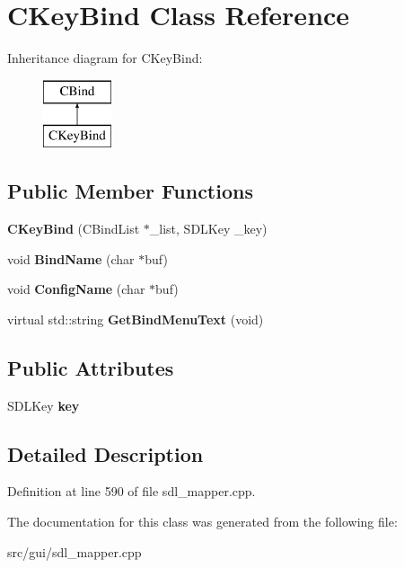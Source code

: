 \hypertarget{classCKeyBind}{\section{C\-Key\-Bind Class Reference}
\label{classCKeyBind}
}
Inheritance diagram for C\-Key\-Bind\-:\begin{figure}[H]
\begin{center}
\leavevmode
\includegraphics[height=2.000000cm]{classCKeyBind}
\end{center}
\end{figure}
\subsection*{Public Member Functions}
\begin{DoxyCompactItemize}
\item 
\hypertarget{classCKeyBind_ace188d08c2721d5f5074cdbd0e52b681}{{\bfseries C\-Key\-Bind} (C\-Bind\-List $\ast$\-\_\-list, S\-D\-L\-Key \-\_\-key)}\label{classCKeyBind_ace188d08c2721d5f5074cdbd0e52b681}

\item 
\hypertarget{classCKeyBind_a35652e64bf1da0c2477e6e235a4d8aec}{void {\bfseries Bind\-Name} (char $\ast$buf)}\label{classCKeyBind_a35652e64bf1da0c2477e6e235a4d8aec}

\item 
\hypertarget{classCKeyBind_a25c924a9b89ff14424899b1779bc70de}{void {\bfseries Config\-Name} (char $\ast$buf)}\label{classCKeyBind_a25c924a9b89ff14424899b1779bc70de}

\item 
\hypertarget{classCKeyBind_a8540f8318b4290091b67f026b07efe73}{virtual std\-::string {\bfseries Get\-Bind\-Menu\-Text} (void)}\label{classCKeyBind_a8540f8318b4290091b67f026b07efe73}

\end{DoxyCompactItemize}
\subsection*{Public Attributes}
\begin{DoxyCompactItemize}
\item 
\hypertarget{classCKeyBind_a5db2e06f00521cdcd4bdf961cb02c336}{S\-D\-L\-Key {\bfseries key}}\label{classCKeyBind_a5db2e06f00521cdcd4bdf961cb02c336}

\end{DoxyCompactItemize}


\subsection{Detailed Description}


Definition at line 590 of file sdl\-\_\-mapper.\-cpp.



The documentation for this class was generated from the following file\-:\begin{DoxyCompactItemize}
\item 
src/gui/sdl\-\_\-mapper.\-cpp\end{DoxyCompactItemize}
